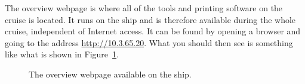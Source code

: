 \documentclass[a4paper,english, 11pt]{article}
\begin{document}
The overview webpage is where all of the tools and printing software on the cruise is located. It runs on the ship and is therefore available during the whole cruise, independent of Internet access. 
It can be found by opening a browser and going to the address \url{http://10.3.65.20}. What you should then see is something like what is shown in Figure~\ref{fig:Printing_overview}.

\begin{figure}[htb]
    \caption{\label{fig:Printing_overview}
        The overview webpage available on the ship.
    }
\end{figure}

\end{document}
